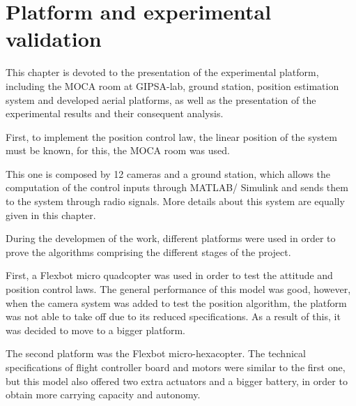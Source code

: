 \chapter{Platform and experimental validation}

\ifpdf
    \graphicspath{{Chapter3/Figs/Raster/}{Chapter3/Figs/PDF/}{Chapter3/Figs/}}
\else
    \graphicspath{{Chapter3/Figs/Vector/}{Chapter3/Figs/}}
\fi

This chapter is devoted to the presentation of the experimental platform, including the
MOCA room at GIPSA-lab, ground station, position estimation system and developed aerial platforms,
as well as the presentation of the experimental results and their consequent analysis.

First, to implement the position control law, the linear position of the system must be known, for this, the MOCA room was used.

This one is composed by 12 cameras and a ground station, which allows the computation of the control inputs through MATLAB/
Simulink and sends them to the system through radio signals. More details about this system are equally given in this chapter.

During the developmen  of the work, different platforms were used in order to prove the algorithms comprising the different stages of the project.

First, a Flexbot micro quadcopter was used in order to test the attitude and position
control laws. The general performance of this model was good, however, when the camera system
was added to test the position algorithm, the platform was not
able to take off due to its reduced specifications. As a result of this, it was decided to
move to a bigger platform.

The second platform was the Flexbot micro-hexacopter. The technical specifications of
flight controller board and motors were similar to the first one, but this model also offered
two extra actuators and a bigger battery, in order to obtain more carrying capacity and
autonomy.

